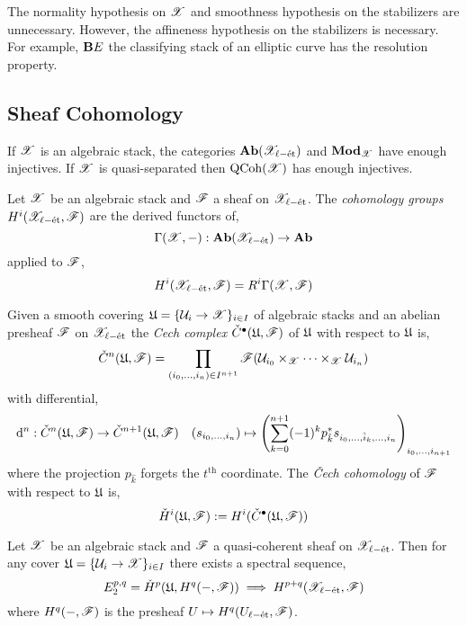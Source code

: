 \documentclass[12pt]{article}
\begin{document}
\begin{rmk}
The normality hypothesis on $\mathscr{X}$ and smoothness hypothesis on the stabilizers are unnecessary. However, the affineness hypothesis on the stabilizers is necessary. For example, $\mathbf{B} E$ the classifying stack of an elliptic curve has the resolution property. 
\end{rmk}

\subsection{Sheaf Cohomology}

\renewcommand{\Cech}{\check{C}}

\begin{lemma}
If $\mathscr{X}$ is an algebraic stack, the categories $\mathbf{Ab}(\mathscr{X}_{\ell-\text{\'{e}t}})$ and $\mathbf{Mod}_{\mathscr{X}}$ have enough injectives. If $\mathscr{X}$ is quasi-separated then $\mathrm{QCoh}{(\mathscr{X})}$ has enough injectives.
\end{lemma}

\begin{defn}
Let $\mathscr{X}$ be an algebraic stack and $\mathscr{F}$ a sheaf on $\mathscr{X}_{\ell-\text{\'{e}t}}$. The \textit{cohomology groups} $H^i(\mathscr{X}_{\ell-\text{\'{e}t}}, \mathscr{F})$ are the derived functors of,
\[ \Gamma(\mathscr{X}, -) : \mathbf{Ab}(\mathscr{X}_{\ell-\text{\'{e}t}}) \to \mathbf{Ab} \]
applied to $\mathscr{F}$,
\[ H^i(\mathscr{X}_{\ell-\text{\'{e}t}}, \mathscr{F}) = R^i \Gamma(\mathscr{X}, \mathscr{F}) \]
\end{defn}

\begin{defn}
Given a smooth covering $\mathfrak{U} = \{ \mathcal{U}_i \to \mathscr{X} \}_{i \in I}$ of algebraic stacks and an abelian presheaf $\mathscr{F}$ on $\mathscr{X}_{\ell-\text{\'{e}t}}$ the \textit{Cech complex} $\Cech^\bullet(\fU, \F)$ of $\mathfrak{U}$ with respect to $\mathfrak{U}$ is,
\[ \Cech^n(\fU, \F) = \prod_{(i_0, \dots, i_n) \in I^{n+1}} \F(\cU_{i_0} \times_{\X} \cdots \times_{\X} \cU_{i_n}) \]
with differential,
\[ \d^n : \Cech^n(\fU, \F) \to \Cech^{n+1}(\fU, \F) \quad (s_{i_0, \dots, i_n}) \mapsto \left( \sum_{k = 0}^{n+1} (-1)^k p_{\hat{k}}^* s_{i_0, \dots, \hat{i}_k, \dots, i_n} \right)_{i_0, \dots, i_{n+1}} \]
where the projection $p_{\hat{k}}$ forgets the $t^{\text{th}}$ coordinate. The \textit{\v{C}ech cohomology} of $\mathscr{F}$ with respect to $\mathfrak{U}$ is,
\[ \check{H}^i(\fU, \F) := H^i(\Cech^\bullet(\fU, \F)) \] 
\end{defn}

\begin{theorem}
Let $\mathscr{X}$ be an algebraic stack and $\mathscr{F}$ a quasi-coherent sheaf on $\mathscr{X}_{\ell-\text{\'{e}t}}$. Then for any cover $\mathfrak{U} = \{ \mathcal{U}_i \to \mathscr{X} \}_{i \in I}$ there exists a spectral sequence,
\[ E^{p,q}_2 = \check{H}^p(\mathfrak{U}, H^q(-,\mathscr{F})) \implies H^{p+q}(\mathscr{X}_{\ell-\text{\'{e}t}}, \mathscr{F}) \]
where $H^q(-,\mathscr{F})$ is the presheaf $U \mapsto H^q(U_{\ell-\text{\'{e}t}}, \mathscr{F})$. 
\end{theorem}
\end{document}
